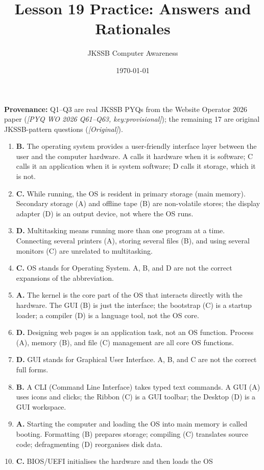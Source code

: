 \documentclass[11pt]{article}
\title{Lesson 19 Practice: Answers and Rationales}
\author{JKSSB Computer Awareness}
\date{\today}
\begin{document}
\maketitle
\noindent\textbf{Provenance:} Q1--Q3 are real JKSSB PYQs from the Website
Operator 2026 paper (\textit{[PYQ WO 2026 Q61--Q63, key:provisional]}); the
remaining 17 are original JKSSB-pattern questions (\textit{[Original]}).
\begin{enumerate}[label=\textbf{Q\arabic*.}, leftmargin=*]
\item \textbf{B.} The operating system provides a user-friendly interface
  layer between the user and the computer hardware. A calls it hardware when it
  is software; C calls it an application when it is system software; D calls it
  storage, which it is not.
\item \textbf{C.} While running, the OS is resident in primary storage (main
  memory). Secondary storage (A) and offline tape (B) are non-volatile stores;
  the display adapter (D) is an output device, not where the OS runs.
\item \textbf{D.} Multitasking means running more than one program at a time.
  Connecting several printers (A), storing several files (B), and using several
  monitors (C) are unrelated to multitasking.
\item \textbf{C.} OS stands for Operating System. A, B, and D are not the
  correct expansions of the abbreviation.
\item \textbf{A.} The kernel is the core part of the OS that interacts directly
  with the hardware. The GUI (B) is just the interface; the bootstrap (C) is a
  startup loader; a compiler (D) is a language tool, not the OS core.
\item \textbf{D.} Designing web pages is an application task, not an OS
  function. Process (A), memory (B), and file (C) management are all core OS
  functions.
\item \textbf{D.} GUI stands for Graphical User Interface. A, B, and C are not
  the correct full forms.
\item \textbf{B.} A CLI (Command Line Interface) takes typed text commands. A
  GUI (A) uses icons and clicks; the Ribbon (C) is a GUI toolbar; the Desktop
  (D) is a GUI workspace.
\item \textbf{A.} Starting the computer and loading the OS into main memory is
  called booting. Formatting (B) prepares storage; compiling (C) translates
  source code; defragmenting (D) reorganises disk data.
\item \textbf{C.} BIOS/UEFI initialises the hardware and then loads the OS

\end{enumerate}
\end{document}

